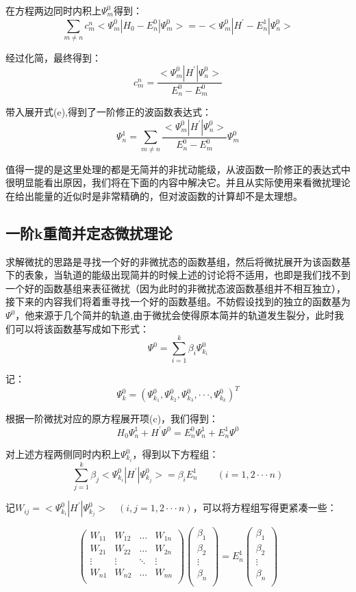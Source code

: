 在方程两边同时内积上$\varPsi_m^0$得到：
\[\sum_{m \neq n} c_m^n<\varPsi_m^0|H_0-E_n^0|\varPsi_m^0>=-<\varPsi_m^0|H^{'}-E_n^1|\varPsi_n^0>\]

经过化简，最终得到：
\[c_m^n=\frac{<\varPsi_m^0|H^{'}|\varPsi_n^0>}{E_n^0-E_m^0}\]

带入展开式(e),得到了一阶修正的波函数表达式：
\[\varPsi_n^1=\sum_{m \neq n}\frac{<\varPsi_m^0|H^{'}|\varPsi_n^0>}{E_n^0-E_m^0}\varPsi_m^0\]

值得一提的是这里处理的都是无简并的非扰动能级，从波函数一阶修正的表达式中很明显能看出原因，我们将在下面的内容中解决它。并且从实际使用来看微扰理论在给出能量的近似时是非常精确的，但对波函数的计算却不是太理想。

\subsection{一阶k重简并定态微扰理论}
求解微扰的思路是寻找一个好的非微扰态的函数基组，然后将微扰展开为该函数基下的表象，当轨道的能级出现简并的时候上述的讨论将不适用，也即是我们找不到一个好的函数基组来表征微扰（因为此时的非微扰态波函数基组并不相互独立），接下来的内容我们将着重寻找一个好的函数基组。不妨假设找到的独立的函数基为$\varPsi^0$，他来源于几个简并的轨道,由于微扰会使得原本简并的轨道发生裂分，此时我们可以将该函数基写成如下形式：
\[\varPsi^0=\sum_{i=1}^k\beta_i\varPsi_{k_i}^0\]

记：
\[\varPsi_k^0=\left (\varPsi_{k_1}^0 , \varPsi_{k_2}^0 ,\varPsi_{k_3}^0, \cdot \cdot \cdot , \varPsi_{k_k}^0\right )^T\]

根据一阶微扰对应的原方程展开项(c)，我们得到：
\[H_0 \varPsi_n^1+H^{'} \varPsi^0=E_n^0 \varPsi_n^1+E_n^1 \varPsi^0\]

对上述方程两侧同时内积上$\varPsi_{k_i}^0$，得到以下方程组：
\[\sum_{j=1}^k\beta_j<\varPsi_{k_i}^0|H^{'}|\varPsi_{k_j}^0>=\beta_i E_n^1 \qquad (i=1,2 \cdot\cdot\cdot n)\]

记$W_{ij}=<\varPsi_{k_i}^0|H^{'}|\varPsi_{k_j}^0> \quad (i,j=1,2 \cdot\cdot\cdot n)$，可以将方程组写得更紧凑一些：

\[
\begin{pmatrix}
W_{11} & W_{12} & \ldots & W_{1n}\\
W_{21} & W_{22} & \ldots & W_{2n}\\
\vdots & \vdots & \ddots & \vdots\\
W_{n1} & W_{n2} & \ldots & W_{nn}\\
\end{pmatrix}
\begin{pmatrix}
\beta_1\\
\beta_2\\
\vdots\\
\beta_n\\
\end{pmatrix}
=E_n^1
\begin{pmatrix}
\beta_1\\
\beta_2\\
\vdots\\
\beta_n\\
\end{pmatrix}
\tag{f} \]

